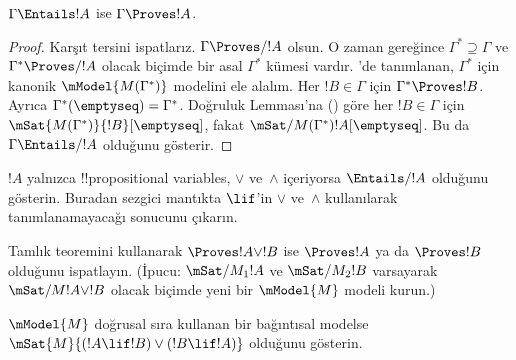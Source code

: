 



\begin{thm}
  $\Gamma\Entails !A$ ise $\Gamma\Proves !A$.
\end{thm}

\begin{proof}
  Karşıt tersini ispatlarız. $\Gamma\Proves/ !A$ olsun. O zaman
   gereğince $\Gamma^*\supseteq\Gamma$ ve
  $\Gamma^*\Proves/ !A$ olacak biçimde bir asal $\Gamma^*$ kümesi vardır.
  'de tanımlanan, $\Gamma^*$ için
  kanonik $\mModel{M(\Gamma^*)}$ modelini ele alalım. Her
  $!B\in\Gamma$ için $\Gamma^*\Proves !B$. Ayrıca
  $\Gamma^*(\emptyseq)=\Gamma^*$. Doğruluk Lemması'na
  () göre her $!B\in\Gamma$ için
  $\mSat{M(\Gamma^*)}{!B}[\emptyseq]$, fakat
  $\mSat/{M(\Gamma^*)}{!A}[\emptyseq]$. Bu da
  $\Gamma\Entails/ !A$ olduğunu gösterir.
\end{proof}

\begin{prob}
  $!A$ yalnızca !!{propositional variable}s, $\lor$ ve~$\land$ içeriyorsa
  $\Entails/ !A$ olduğunu gösterin. Buradan sezgici mantıkta $\lif$'in
  $\lor$ ve~$\land$ kullanılarak tanımlanamayacağı sonucunu çıkarın.
\end{prob}

\begin{prob}
  Tamlık teoremini kullanarak $\Proves !A\lor !B$ ise $\Proves !A$ ya da
  $\Proves !B$ olduğunu ispatlayın. (İpucu: $\mSat/{M_1}{!A}$ ve
  $\mSat/{M_2}{!B}$ varsayarak $\mSat/{M}{!A\lor !B}$ olacak biçimde yeni
  bir $\mModel{M}$ modeli kurun.)
\end{prob}

\begin{prob}
  $\mModel{M}$ doğrusal sıra kullanan bir bağıntısal modelse
  $\mSat{M}{(!A\lif !B)\lor(!B\lif !A)}$ olduğunu gösterin.
\end{prob}

